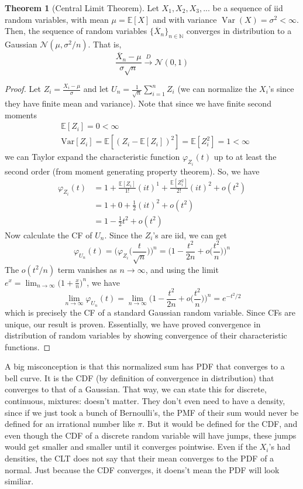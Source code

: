 \documentclass{article}
\DeclareMathOperator{\Var}{Var}
\theoremstyle{definition}
\newtheorem{theorem}{Theorem}[section]
\theoremstyle{remark}
\theoremstyle{definition}
\begin{document}
\begin{theorem}[Central Limit Theorem]
Let $X_1, X_2, X_3, ...$ be a sequence of iid random variables, with mean $\mu = \mathbb{E}[X]$ and with variance $\Var(X) = \sigma^2 < \infty$. Then, the sequence of random variables $\{\overline{X}_n\}_{n \in \mathbb{N}}$ converges in distribution to a Gaussian $\mathcal{N}(\mu, \sigma^2 / n)$. That is, 
\[\frac{\overline{X}_n - \mu}{\sigma \sqrt{n}} \xrightarrow{D} \mathcal{N}(0, 1)\]
\end{theorem}
\begin{proof}
Let $Z_i = \frac{X_i - \mu}{\sigma}$ and let $U_n = \frac{1}{\sqrt{n}} \sum_{i=1}^n Z_i$ (we can normalize the $X_i$'s since they have finite mean and variance). Note that since we have finite second moments 
\begin{align*}
    & \mathbb{E}[Z_i] = 0 < \infty \\
    & \mathrm{Var}[Z_i] = \mathbb{E}[ (Z_i - \mathbb{E}[Z_i])^2] = \mathbb{E}[Z_i^2] = 1 < \infty 
\end{align*}
we can Taylor expand the characteristic function $\varphi_{Z_i} (t)$ up to at least the second order (from moment generating property theorem). So, we have 
\begin{align*}
    \varphi_{Z_i} (t) & = 1 + \frac{\mathbb{E}[Z_i]}{1!} (i t)^1 + \frac{\mathbb{E}[Z_i^2]}{2!} (i t)^2 + o (t^2) \\
    & = 1 + 0 + \frac{1}{2} (i t)^2 + o (t^2) \\
    & = 1 - \frac{1}{2} t^2 + o(t^2) 
\end{align*}
Now calculate the CF of $U_n$. Since the $Z_i$'s are iid, we can get 
\[\varphi_{U_n} (t) = \Big( \varphi_{Z_i} \big( \frac{t}{\sqrt{n}} \big) \Big)^n = \Big( 1 - \frac{t^2}{2n} + o \big( \frac{t^2}{n} \big) \Big)^n\]
The $o(t^2 / n)$ term vanishes as $n \rightarrow \infty$, and using the limit $e^x = \lim_{n \rightarrow \infty} \big( 1 + \frac{x}{n} \big)^n$, we have 
\[\lim_{n \rightarrow \infty} \varphi_{U_n} (t) = \lim_{n \rightarrow \infty} \Big( 1 - \frac{t^2}{2n} + o \big( \frac{t^2}{n} \big) \Big)^n = e^{-t^2 / 2}\]
which is precisely the CF of a standard Gaussian random variable. Since CFs are unique, our result is proven. Essentially, we have proved convergence in distribution of random variables by showing convergence of their characteristic functions. 
\end{proof}

A big misconception is that this normalized sum has PDF that converges to a bell curve. It is the CDF (by definition of convergence in distribution) that converges to that of a Gaussian. That way, we can state this for discrete, continuous, mixtures: doesn't matter. They don't even need to have a density, since if we just took a bunch of Bernoulli's, the PMF of their sum would never be defined for an irrational number like $\pi$. But it would be defined for the CDF, and even though the CDF of a discrete random variable will have jumps, these jumps would get smaller and smaller until it converges pointwise. Even if the $X_i$'s had densities, the CLT does not say that their mean converges to the PDF of a normal. Just because the CDF converges, it doens't mean the PDF will look similiar. 
\end{document}
